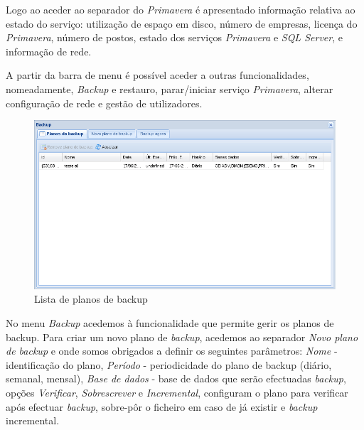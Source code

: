 Logo ao aceder ao separador do \textit{Primavera} é apresentado informação relativa ao estado do serviço: utilização de espaço em disco, número de empresas, licença do \textit{Primavera}, número de postos, estado dos serviços \textit{Primavera} e \textit{SQL Server}, e informação de rede.

A partir da barra de menu é possível aceder a outras funcionalidades, nomeadamente, \textit{Backup} e restauro, parar/iniciar serviço \textit{Primavera}, alterar configuração de rede e gestão de utilizadores.

\begin{figure}[H]
    \begin{center}
    \includegraphics[scale=0.38]{screenshots/primavera/primaverainterface_02.png}
    \caption{Lista de planos de backup}
    \label{fig:primavera_list_backup_plans}
    \end{center}
\end{figure}

No menu \textit{Backup} acedemos à funcionalidade que permite gerir os planos de backup.
Para criar um novo plano de \textit{backup}, acedemos ao separador \textit{Novo plano de backup} e onde somos obrigados a definir os seguintes parâmetros: \textit{Nome} - identificação do plano, \textit{Período} - periodicidade do plano de backup (diário, semanal, mensal), \textit{Base de dados} - base de dados que serão efectuadas \textit{backup}, opções \textit{Verificar}, \textit{Sobrescrever} e \textit{Incremental}, configuram o plano para verificar após efectuar \textit{backup}, sobre-pôr o ficheiro em caso de já existir e \textit{backup} incremental.

